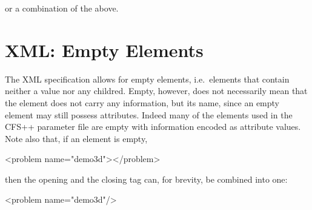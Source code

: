 or a combination of the above.



\section{XML: Empty Elements}
%
%
The XML specification allows for empty elements, i.e.~elements that contain
neither a value nor any childred. Empty, however, does not necessarily mean
that the element does not carry any information, but its name, since an empty
element may still possess attributes. Indeed many of the elements used in the
CFS++ parameter file are empty with information encoded as attribute values.
Note also that, if an element is empty,
\begin{xmllisting}
   <problem name="demo3d"></problem>
\end{xmllisting}
then the opening and the closing tag can, for brevity, be combined into one:
\begin{xmllisting}
   <problem name="demo3d"/>
\end{xmllisting}


